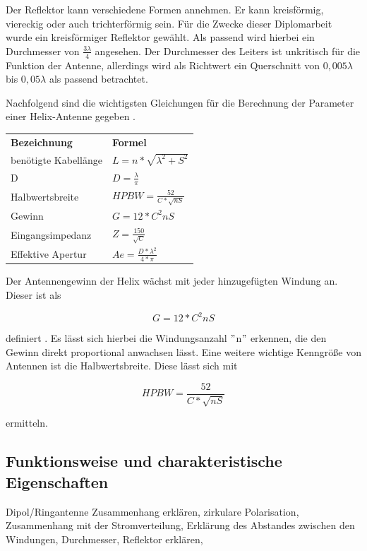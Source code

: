 Der Reflektor kann verschiedene Formen annehmen. Er kann kreisförmig, viereckig oder auch trichterförmig sein. Für die Zwecke dieser Diplomarbeit wurde ein kreisförmiger Reflektor gewählt. Als passend wird hierbei ein Durchmesser von $\frac{3\lambda}{4}$ angesehen. Der Durchmesser des Leiters ist unkritisch für die Funktion der Antenne, allerdings wird als Richtwert ein Querschnitt von $0,005\lambda$ bis $0,05\lambda$ als passend betrachtet. 

Nachfolgend sind die wichtigsten Gleichungen für die Berechnung der Parameter einer Helix-Antenne gegeben \cite{Kraus-2002-AntennasB}.

\begin{table}[H]
	\begin{tabular}{|l|l|}

		\textbf{Bezeichnung} & \textbf{Formel}\\ 
		benötigte Kabellänge & $L=n*\sqrt{\lambda^2+S^2}$ \\
		D				     & $D=\frac{\lambda}{\pi}$\\ 
		Halbwertsbreite		 & $HPBW=\frac{52}{C*\sqrt{nS}}$ \\ 
		Gewinn               & $G=12*C^2nS$                 \\ 
		Eingangsimpedanz     & $Z=\frac{150}{\sqrt{C}}$      \\ 
		Effektive Apertur    & $Ae=\frac{D*\lambda^2}{4*\pi}$ \\ 
		\end{tabular}
	\end{table}

Der Antennengewinn der Helix wächst mit jeder hinzugefügten Windung an. Dieser ist als

\begin{equation}
	G=12*C^2nS
\end{equation}

definiert \cite{helix-calc-daycounter}. Es lässt sich hierbei die Windungsanzahl $"$n$"$ erkennen, die den Gewinn direkt proportional anwachsen lässt. Eine weitere wichtige Kenngröße von Antennen ist die Halbwertsbreite. Diese lässt sich mit

\begin{equation}
	HPBW=\frac{52}{C*\sqrt{nS}}
\end{equation}

ermitteln.

\subsection{Funktionsweise und charakteristische Eigenschaften}
Dipol/Ringantenne Zusammenhang erklären, zirkulare Polarisation, Zusammenhang mit der Stromverteilung, Erklärung des Abstandes zwischen den Windungen, Durchmesser, Reflektor erklären,
